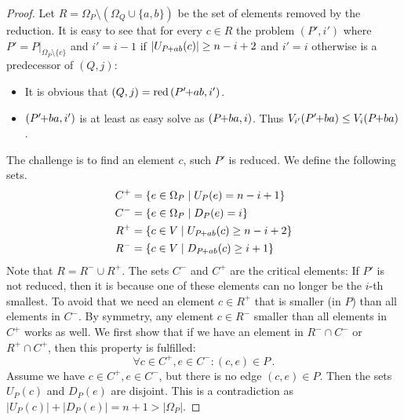 \documentclass[twoside,leqno,twocolumn]{article}
\newcommand{\pchild}[3]{{#1}\kern-1pt{+}{#2}{#3}}
\newcommand{\reduced}[1]{\operatorname{red}{#1}}
\newcommand{\less}[2]{D_{#1}(#2)}
\newcommand{\greater}[2]{U_{#1}(#2)}
\begin{document}
\begin{proof}
  Let $R = \Omega_P \setminus (\Omega_Q \cup \{a, b\})$ be the set of elements removed by the reduction.
  It is easy to see that for every $c \in R$ the problem $(P', i')$ where $P' = P|_{\Omega_P \setminus \{c\}}$ and $i' = i - 1$ if $|\greater{\pchild{P}{a}{b}}{c}| \ge n-i+2$ and $i'=i$ otherwise is a predecessor of $(Q, j)$:
  \begin{itemize}
    \item It is obvious that $(Q, j) = \reduced{(\pchild{P'}{a}{b}, i')}$.
    \item $(\pchild{P'}{b}{a}, i')$ is at least as easy solve as $(\pchild{P}{b}{a}, i)$. Thus $V_{i'}(\pchild{P'}{b}{a}) \le V_i(\pchild{P}{b}{a})$.
  \end{itemize}
  The challenge is to find an element $c$, such $P'$ is reduced.
  We define the following sets.
  \begin{align*}
    C^+ & = \{e \in \Omega_P \mid \greater{P}{e} = n - i + 1\}            \\
    C^- & = \{e \in \Omega_P \mid \less{P}{e} = i \}                      \\
    R^+ & = \{c \in V \mid \greater{\pchild{P}{a}{b}}{c} \ge n - i + 2 \} \\
    R^- & = \{c \in V \mid \less{\pchild{P}{a}{b}}{c} \ge i + 1 \}
  \end{align*}
  Note that $R = R^- \cup R^+$.
  The sets $C^-$ and $C^+$ are the critical elements:
  If $P'$ is not reduced, then it is because one of these elements can no longer be the $i$-th smallest.
  To avoid that we need an element $c \in R^+$ that is smaller (in $P$) than all elements in $C^-$.
  By symmetry, any element $c \in R^-$ smaller than all elements in $C^+$ works as well.
  We first show that if we have an element in $R^- \cap C^-$ or $R^+ \cap C^+$, then this property is fulfilled:
  \begin{equation}
    \forall c \in C^+, e \in C^- \colon (c, e) \in P\,\text{.}
  \end{equation}
  Assume we have $c \in C^+, e \in C^-$, but there is no edge $(c, e) \in P$.
  Then the sets $\greater{P}{c}$ and $\less{P}{e}$ are disjoint.
  This is a contradiction as $|\greater{P}{c}| + |\less{P}{e}| = n + 1 > |\Omega_P|$.


\end{proof}
\end{document}

